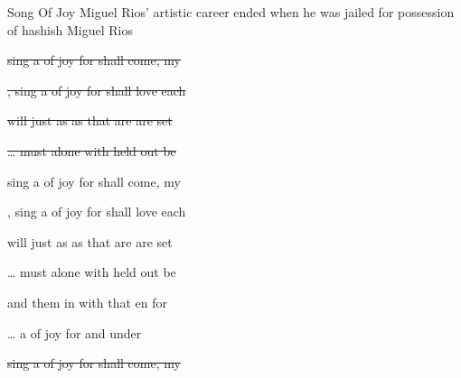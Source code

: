 \begin{SBSong}{Song Of Joy}
  {Miguel Rios' artistic career ended when he was jailed for possession of hashish}
  {Miguel Rios}
  \begin{SBVerse}
    \sout{ sing a  of joy for  shall come, 
     my }
    
    \sout{, sing a  of joy for  shall love 
    each }
  
    \sout{  will  just as  as  
     that are  are  set }
    
    \sout{\ldots {} must  alone with  
     held out be }
  \end{SBVerse}
  \WBPageBrk
  \begin{SBVerse}
     sing a  of joy for  shall come, 
     my 
    
    , sing a  of joy for  shall love 
    each 
  \end{SBVerse}
  \begin{SBVerse}
      will  just as  as  
     that are  are  set 
    
    \ldots {} must  alone with  
     held out be 
  \end{SBVerse}
  \begin{SBVerse}
      and  them in  with 
     that en for 
 
    \ldots {} a  of joy for  
     and under
  \end{SBVerse}
  \begin{SBVerse}
    \sout{ sing a  of joy for  shall come, 
     my }
    

\end{SBVerse}
\end{SBSong}
